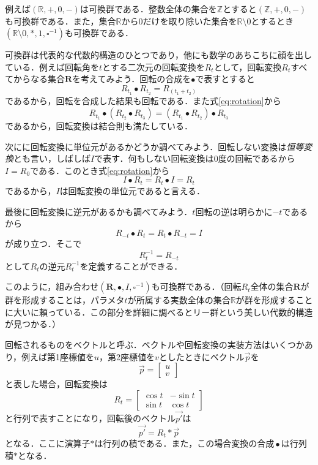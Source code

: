 \documentclass[twocolumn]{jsbook}
\newcommand{\keyword}[1]{{\emph{#1}}}
\DeclareMathOperator{\mathCompose}{\bullet}
\newcommand{\mathSomething}{\square}
\newcommand{\mathSet}[1]{\mathbf{#1}}
\newcommand{\mathSpecialSet}[1]{\mathbb{#1}}
\newcommand{\mathVector}[1]{\vec{#1}}
\newcommand{\mathGroup}[4]{(#1,#2,#3,#4)}
\begin{document}
例えば$\mathGroup{\mathSpecialSet{R}}{+}{0}{-}$は可換群である．整数全体の集合を$\mathSpecialSet{Z}$とすると$\mathGroup{\mathSpecialSet{Z}}{+}{0}{-}$も可換群である．また，集合$\mathSpecialSet{R}$から$0$だけを取り除いた集合を$\mathSpecialSet{R}\setminus0$とするとき$\mathGroup{\mathSpecialSet{R}\setminus0}{*}{1}{\mathSomething^{-1}}$も可換群である．

可換群は代表的な代数的構造のひとつであり，他にも数学のあちこちに顔を出している．例えば回転角を$t$とする二次元の回転変換を$R_t$として，回転変換$R_t$すべてからなる集合$\mathSet{R}$を考えてみよう．回転の合成を$\bullet$で表すとすると
\begin{equation}
\label{eq:rotation}
R_{t_1}\bullet R_{t_2}=R_{(t_1+t_2)}
\end{equation}
であるから，回転を合成した結果も回転である．また式\eqref{eq:rotation}から$$R_{t_1}\bullet\left(R_{t_2}\bullet R_{t_3}\right)=\left(R_{t_1}\bullet R_{t_2}\right)\bullet R_{t_3}$$
であるから，回転変換は結合則も満たしている．

次にに回転変換に単位元があるかどうか調べてみよう．回転しない変換は\keyword{恒等変換}とも言い，しばしば$I$で表す．何もしない回転変換は$0$度の回転であるから$I=R_0$である．このとき式\eqref{eq:rotation}から$$I\bullet R_t=R_t\bullet I=R_t$$であるから，$I$は回転変換の単位元であると言える．

最後に回転変換に逆元があるかも調べてみよう．$t$回転の逆は明らかに$-t$であるから$$R_{-t}\bullet R_t=R_t\bullet R_{-t}=I$$が成り立つ．そこで$$R_{t}^{-1}=R_{-t}$$として$R_t$の逆元$R_t^{-1}$を定義することができる．

このように，組み合わせ$\mathGroup{\mathSet{R}}{\bullet}{I}{\mathSomething^{-1}}$も可換群である．（回転$R_t$全体の集合$\mathSet{R}$が群を形成することは，パラメタ$t$が所属する実数全体の集合$\mathSpecialSet{R}$が群を形成することに大いに頼っている．この部分を詳細に調べるとリー群という美しい代数的構造が見つかる．）

回転されるものをベクトルと呼ぶ．ベクトルや回転変換の実装方法はいくつかあり，例えば第1座標値を$u$，第2座標値を$v$としたときにベクトル$\mathVector{p}$を$$\mathVector{p}=\begin{bmatrix}u\\v\end{bmatrix}$$と表した場合，回転変換は$$R_t=\begin{bmatrix}\cos t&-\sin t\\\sin t&\cos t\end{bmatrix}$$と行列で表すことになり，回転後のベクトル$\mathVector{p'}$は$$\mathVector{p'}=R_t*\mathVector{p}$$となる．ここに演算子$*$は行列の積である．また，この場合変換の合成$\mathCompose$は行列積$*$となる．
\end{document}
